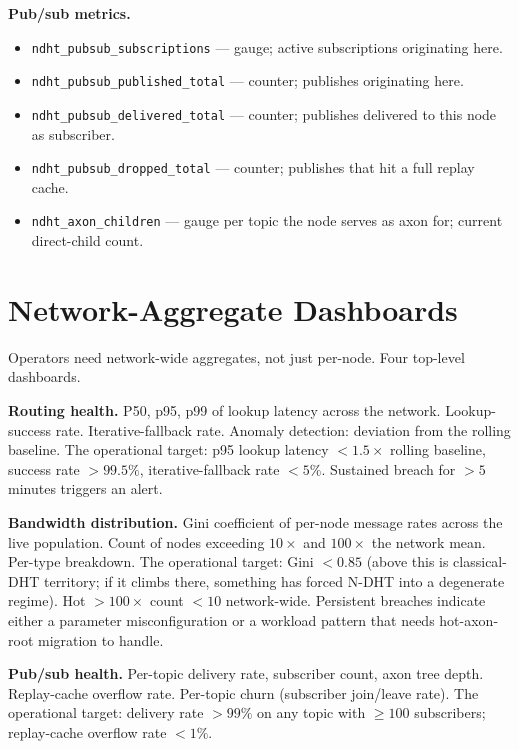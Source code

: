 \documentclass[twoside,nobib]{tufte-book}
\newcommand{\NDHT}{N-DHT\xspace}
\begin{document}
\textbf{Pub/sub metrics.}

\begin{itemize}\setlength\itemsep{0.1em}
  \item \texttt{ndht\_pubsub\_subscriptions} --- gauge; active
    subscriptions originating here.
  \item \texttt{ndht\_pubsub\_published\_total} --- counter;
    publishes originating here.
  \item \texttt{ndht\_pubsub\_delivered\_total} --- counter;
    publishes delivered to this node as subscriber.
  \item \texttt{ndht\_pubsub\_dropped\_total} --- counter;
    publishes that hit a full replay cache.
  \item \texttt{ndht\_axon\_children} --- gauge per topic the
    node serves as axon for; current direct-child count.
\end{itemize}

\section{Network-Aggregate Dashboards}

Operators need network-wide aggregates, not just per-node. Four
top-level dashboards.

\textbf{Routing health.} P50, p95, p99 of lookup latency across
the network. Lookup-success rate. Iterative-fallback rate.
Anomaly detection: deviation from the rolling baseline. The
operational target: p95 lookup latency $< 1.5\times$ rolling
baseline, success rate $> 99.5\%$, iterative-fallback rate
$< 5\%$. Sustained breach for $> 5$ minutes triggers an alert.

\textbf{Bandwidth distribution.} Gini coefficient of per-node
message rates across the live population. Count of nodes
exceeding $10\times$ and $100\times$ the network mean. Per-type
breakdown. The operational target: Gini $< 0.85$ (above this is
classical-DHT territory; if it climbs there, something has
forced \NDHT into a degenerate regime). Hot $>100\times$ count
$< 10$ network-wide. Persistent breaches indicate either a
parameter misconfiguration or a workload pattern that needs
hot-axon-root migration to handle.

\textbf{Pub/sub health.} Per-topic delivery rate, subscriber
count, axon tree depth. Replay-cache overflow rate. Per-topic
churn (subscriber join/leave rate). The operational target:
delivery rate $> 99\%$ on any topic with $\geq 100$
subscribers; replay-cache overflow rate $< 1\%$.
\end{document}
